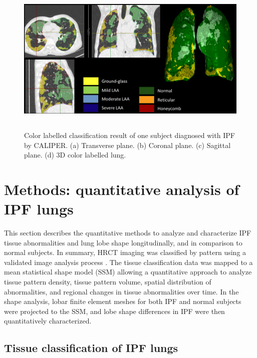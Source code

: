 \begin{figure}[htbp]
  \centering 
  \includegraphics[height=2.9in]{QuantitativeAnalysis/Image/CALIPERResults.png}
  \caption{Color labelled classification result of one subject diagnosed with IPF by CALIPER.  (a) Transverse plane. (b) Coronal plane. (c) Sagittal plane. (d) 3D color labelled lung.}
  \label{fig:CALIPERResults}
\end{figure}


\section{Methods: quantitative analysis of IPF lungs}
This section describes the quantitative methods to analyze and characterize IPF tissue abnormalities and lung lobe shape longitudinally, and in comparison to normal subjects. In summary, HRCT imaging was classified by pattern using a validated image analysis process \citep{maldonado2013automated,bartholmai2013quantitative,raghunath2014quantitative}. The tissue classification data was mapped to a mean statistical shape model (SSM) allowing a quantitative approach to analyze tissue pattern density, tissue pattern volume, spatial distribution of abnormalities, and regional changes in tissue abnormalities over time. In the shape analysis, lobar finite element meshes for both IPF and normal subjects were projected to the SSM, and lobe shape differences in IPF were then quantitatively characterized.

\subsection{Tissue classification of IPF lungs}
